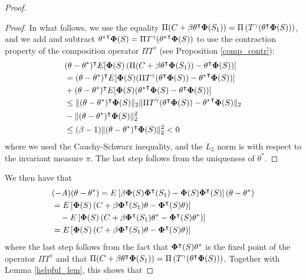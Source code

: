 \documentclass[10pt,a4paper]{amsart}
\begin{document}
\begin{proof}
\begin{proof}
In what follows, we use the equality $\Pi(C+\beta \theta^\intercal{\bf \Phi}(S_1) ) = \Pi\left( T^\gamma ( \theta^\intercal{\bf \Phi}(S) ) \right)$, and we add and subtract ${\theta^*}^\intercal{\bf \Phi}(S) =\Pi T^\gamma({\theta^*}^\intercal{\bf \Phi}(S)  )$ to use the contraction property of the composition operator $\Pi T^\gamma$ (see Proposition \ref{comp_contr}):
\begin{align*}
& (\theta-\theta^*)^\intercal E[ {\bf \Phi}(S)\left(  \Pi(C+\beta \theta^\intercal{\bf \Phi}(S_1) )-\theta^\intercal{\bf \Phi}(S) \right)] \\
&= (\theta-\theta^*)^\intercal E[ {\bf \Phi}(S) (\Pi T^\gamma(\theta^\intercal{\bf \Phi}(S))-  {\theta^*}^\intercal{\bf \Phi}(S)  ) ]\\
& +  (\theta-\theta^*)^\intercal E[ {\bf \Phi}(S) ( {\theta^*}^\intercal{\bf \Phi}(S) -  \theta^\intercal{\bf \Phi}(S)  )]\\
&\leq  \| (\theta-\theta^*)^\intercal  {\bf \Phi}(S)\|_2 \| \Pi T^\gamma(\theta^\intercal{\bf \Phi}(S))-  {\theta^*}^\intercal{\bf \Phi}(S)\|_2\\
& - \| (\theta-\theta^*)^\intercal  {\bf \Phi}(S)\|^2_2\\
& \leq  (\beta-1) \| (\theta-\theta^*)^\intercal  {\bf \Phi}(S)\|^2_2 <0
\end{align*}
where we used the Cauchy-Schwarz inequality, and the $L_2$ norm is with respect to the invariant measure $\pi$. The last step follows from the uniqueness of $\theta^*$.
\end{proof}
We then have that
 \begin{align*}
 &(-A) (\theta-\theta^*)=E\left[\beta {\bf \Phi}(S){\bf \Phi}^\intercal(S_{1})- {\bf \Phi}(S){\bf \Phi}^\intercal(S)  \right] (\theta-\theta^*)\\
 &= E\left[{\bf \Phi}(S)\left( C+\beta {\bf \Phi}^\intercal(S_{1})\theta- {\bf \Phi}^\intercal(S)\theta \right) \right]\\
 & \quad - E\left[{\bf \Phi}(S)\left( C+\beta {\bf \Phi}^\intercal(S_{1})\theta^*- {\bf \Phi}^\intercal(S)\theta^* \right) \right]\\
 &=E\left[{\bf \Phi}(S)\left( C+\beta {\bf \Phi}^\intercal(S_{1})\theta- {\bf \Phi}^\intercal(S)\theta \right) \right]
 \end{align*}
 where the last step follows from the fact that ${\bf \Phi}^\intercal(S)\theta^*$ is the fixed point of the operator $\Pi T^\gamma$ and that $\Pi(C+\beta \theta^\intercal{\bf \Phi}(S_1) ) = \Pi\left( T^\gamma ( \theta^\intercal{\bf \Phi}(S) ) \right)$.  Together with Lemma \ref{helpful_lem}, this shows that 

\end{proof}
\end{document}
